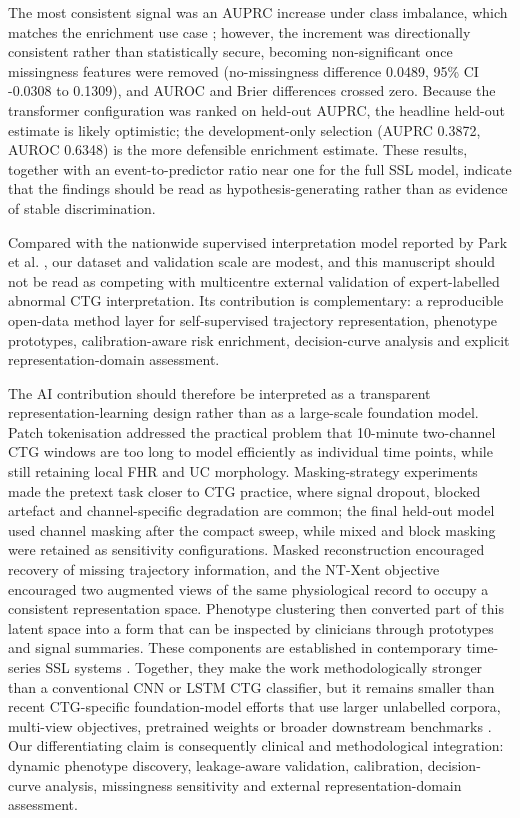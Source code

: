 \documentclass[utf8]{FrontiersinHarvard}
\begin{document}
The most consistent signal was an AUPRC increase under class imbalance, which matches the enrichment use case \citep{davis2006}; however, the increment was directionally consistent rather than statistically secure, becoming non-significant once missingness features were removed (no-missingness difference 0.0489, 95\% CI -0.0308 to 0.1309), and AUROC and Brier differences crossed zero. Because the transformer configuration was ranked on held-out AUPRC, the headline held-out estimate is likely optimistic; the development-only selection (AUPRC 0.3872, AUROC 0.6348) is the more defensible enrichment estimate. These results, together with an event-to-predictor ratio near one for the full SSL model, indicate that the findings should be read as hypothesis-generating rather than as evidence of stable discrimination.

Compared with the nationwide supervised interpretation model reported by Park et al. \citep{park2025nationwide}, our dataset and validation scale are modest, and this manuscript should not be read as competing with multicentre external validation of expert-labelled abnormal CTG interpretation. Its contribution is complementary: a reproducible open-data method layer for self-supervised trajectory representation, phenotype prototypes, calibration-aware risk enrichment, decision-curve analysis and explicit representation-domain assessment.

The AI contribution should therefore be interpreted as a transparent representation-learning design rather than as a large-scale foundation model. Patch tokenisation addressed the practical problem that 10-minute two-channel CTG windows are too long to model efficiently as individual time points, while still retaining local FHR and UC morphology. Masking-strategy experiments made the pretext task closer to CTG practice, where signal dropout, blocked artefact and channel-specific degradation are common; the final held-out model used channel masking after the compact sweep, while mixed and block masking were retained as sensitivity configurations. Masked reconstruction encouraged recovery of missing trajectory information, and the NT-Xent objective encouraged two augmented views of the same physiological record to occupy a consistent representation space. Phenotype clustering then converted part of this latent space into a form that can be inspected by clinicians through prototypes and signal summaries. These components are established in contemporary time-series SSL systems \citep{nie2023,yue2022,zhang2022tfc,goswami2024moment}. Together, they make the work methodologically stronger than a conventional CNN or LSTM CTG classifier, but it remains smaller than recent CTG-specific foundation-model efforts that use larger unlabelled corpora, multi-view objectives, pretrained weights or broader downstream benchmarks \citep{fridman2026ctgfoundation,prismctg2026}. Our differentiating claim is consequently clinical and methodological integration: dynamic phenotype discovery, leakage-aware validation, calibration, decision-curve analysis, missingness sensitivity and external representation-domain assessment.
\end{document}
